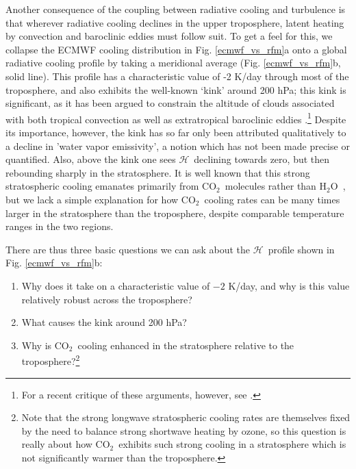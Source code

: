 \documentclass{ametsoc}
\newcommand{\cotwo}{\ensuremath{\mathrm{CO_2}}}
\newcommand{\htwo}{\ensuremath{\mathrm{H_2O}}}
\newcommand{\ch}{\ensuremath{\mathcal{H}}}
\begin{document}
Another consequence of the coupling between radiative cooling and turbulence is that wherever radiative cooling declines in the upper troposphere, latent heating by convection and baroclinic eddies must follow suit. To get a feel for this, we collapse the ECMWF cooling distribution in Fig. \ref{ecmwf_vs_rfm}a onto a global radiative cooling profile by taking a meridional average (Fig. \ref{ecmwf_vs_rfm}b, solid line). This profile has a characteristic value of -2 K/day through most of the troposphere, and also exhibits the well-known `kink' around 200 hPa; this kink is significant, as it has been argued to constrain  the altitude of clouds associated with both tropical convection \citep[i.e. the FAT hypothesis,][]{hartmann2002,hartmann2001} as well as extratropical baroclinic eddies \citep{thompson2017}.\footnote{For a recent critique of these arguments, however, see  \cite{seeley2019a,seeley2019b}.}
 Despite its importance, however, the kink has so far only been attributed qualitatively to a decline in 'water vapor emissivity', a notion which has not been made precise or quantified. Also, above the kink one sees \ch\  declining towards zero, but then rebounding sharply in the stratosphere. It is well known that this strong stratospheric cooling emanates primarily from  \cotwo\ molecules rather than  \htwo\  \citep[e.g][]{zhu1992, manabe1964}, but we lack a simple explanation for how \cotwo\ cooling rates can be many times larger in the stratosphere than the troposphere, despite comparable temperature ranges in the two regions.  %

There are thus three basic questions we can ask about the \ch\ profile shown in Fig. \ref{ecmwf_vs_rfm}b:
\begin{enumerate}
	\item \label{Q2k} Why does it take on a characteristic value of $-2$  K/day, and why is this value relatively robust across  the troposphere?
	\item \label{Qkink} What causes the kink around 200 hPa?
	\item \label{Qstrat} Why is \cotwo\ cooling enhanced in the stratosphere relative to the troposphere?\footnote{Note that the strong longwave stratospheric cooling rates  are themselves fixed by the need to balance strong shortwave heating by ozone, so this question is really about how \cotwo\ exhibits such strong cooling in a stratosphere  which is not significantly warmer than the troposphere.}
\end{enumerate}
\end{document}
